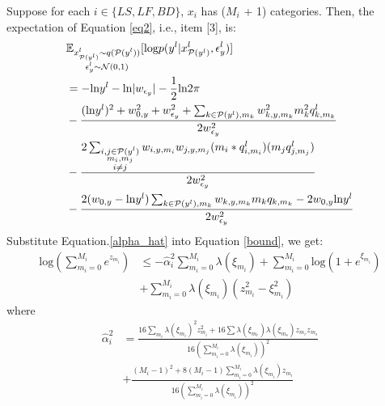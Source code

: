 \documentclass[review]{elsarticle}
\begin{document}
Suppose for each $i \in \{LS, LF, BD\}$, $x_{i}$ has ($M_{i}$ + 1) categories. Then, the expectation of Equation \ref{eq2}, i.e., item [3], is:
\begin{equation*}
\begin{aligned}
& \mathbb{E}_{\begin{subarray}{c} x_{\mathcal{P}(y^l)}^l \sim q(\mathcal{P}(y^l))\\  \epsilon_{y}^l \sim \mathcal N(0,1)\end{subarray}}[\text{log}p(y^l|x_{\mathcal{P}(y^l)}^l,\epsilon_{y}^l)] \\
& = -\text{ln}y^l - \text{ln}|w_{\epsilon_{y}}| - \frac{1}{2}\text{ln}2\pi \\
& - \frac{(\text{ln}y^l)^2 + w_{0,y}^2 + w_{\epsilon_{y}}^2 + \sum_{k \in \mathcal{P}(y^l), m_{k}}w_{k,y, m_{k}}^2 m_{k}^2 q^l_{k,m_{k}}}{2w_{\epsilon_{y}}^2} \\
& - \frac{2\sum_{\begin{subarray}{c} i,j \in \mathcal{P}(y^l)\\ m_{i}, m_{j}\\ i \neq j\end{subarray}}w_{i,y, m_{i}}w_{j,y, m_{j}}(m_{i}*q^l_{i,m_{i}})(m_{j} q^l_{j,m_{j}})}{2w_{\epsilon_{y}}^2 } \\
& - \frac{2(w_{0,y}-\text{ln}y^l)\sum_{k \in \mathcal{P}(y^l), m_{k}}w_{k,y, m_{k}}m_{k}q_{k, m_{k}} - 2w_{ 0,y}\text{ln}y^l}{2w_{\epsilon_{y}}^2 }
\end{aligned}
\end{equation*}
Substitute Equation.\ref{alpha_hat} into Equation \ref{bound}, we get:
\begin{equation*}
\begin{aligned}
    \text{log}(\sum_{m_{i} = 0}^{M_{i}}e^{z_{m_{i}}})
    & \leq -\hat{\alpha}^{2}_{i}\sum_{m_{i} = 0}^{M_{i}}\lambda(\xi_{m_{i}}) +\sum_{m_{i} = 0}^{M_{i}}\text{log}(1+e^{\xi_{m_{i}}})\\
    & +\sum_{m_{i} = 0}^{M_{i}}\lambda(\xi_{m_{i}})(z_{m_{i}}^{2}-\xi_{m_{i}}^{2})
\end{aligned}
\end{equation*}
\noindent where 
\begin{equation*}
    \begin{aligned}
        \hat{\alpha}^{2}_{i} & = \frac{16\sum_{m_{i}}\lambda(\xi_{m_{i}})^{2}z_{m_{i}}^{2} + 16\sum \lambda(\xi_{m_{r}})\lambda(\xi_{m_{s}})z_{m_{r}}z_{m_{s}}}{16(\sum_{m_{i} = 0}^{M_{i}}\lambda(\xi_{m_{i}}))^{2}} \\
        & + \frac{(M_{i} - 1)^{2} + 8(M_{i} - 1)\sum_{m_{i} = 0}^{M_{i}}\lambda(\xi_{m_{i}})z_{m_{i}} }{16(\sum_{m_{i} = 0}^{M_{i}}\lambda(\xi_{m_{i}}))^{2}} 
    \end{aligned}
\end{equation*}
\end{document}
